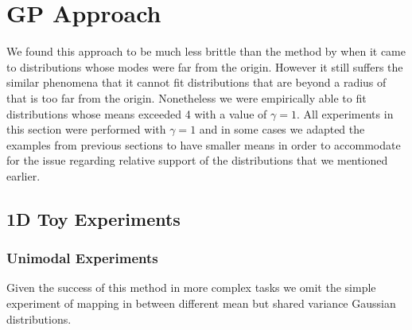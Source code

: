 \documentclass[a4paper,12pt,twoside,openright]{report}
\theoremstyle{definition}
\begin{document}
\section{GP Approach}

We found this approach to be much less brittle than the method by \cite{pavon2018data} when it came to distributions whose modes were far from the origin. However it still suffers the similar phenomena that it cannot fit  distributions that are beyond a radius of that is too far from the origin. Nonetheless we were empirically able to fit distributions whose means exceeded 4 with a value of $\gamma=1$. All experiments in this section were performed with $\gamma=1$ and in some cases we adapted the examples from previous sections to have smaller means in order to accommodate for the issue regarding relative support of the distributions that we mentioned earlier.
\subsection{1D Toy Experiments }
\subsubsection{Unimodal Experiments}
Given the success of this method in more complex tasks we omit the simple experiment of mapping in between different mean but shared variance Gaussian distributions.
\end{document}
